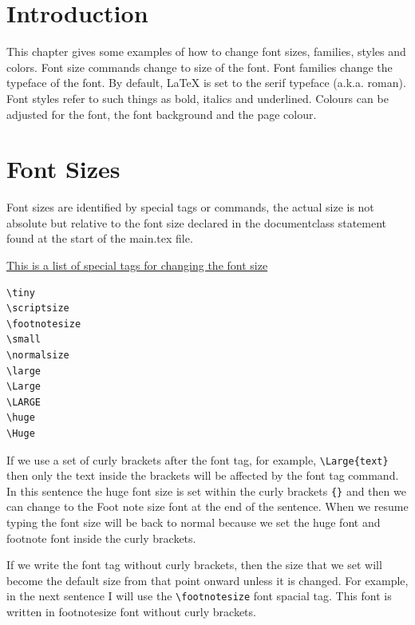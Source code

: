 


\section{Introduction}

This chapter gives some examples of how to change font sizes, families, styles and colors. Font size  commands change to size of the font. Font families change the typeface of the font. By default, LaTeX is set to the serif typeface (a.k.a. roman). Font styles refer to such things as bold, italics and underlined. Colours can be adjusted for the font, the font background and the page colour. 


\section{Font Sizes}

Font sizes are identified by special tags or commands, the actual size is not absolute but relative to the font size declared in the documentclass statement found at the start of the main.tex file.

\vspace{0.3cm}

\underline{This is a list of special tags for changing the font size}
\begin{verbatim}
\tiny 
\scriptsize
\footnotesize
\small
\normalsize
\large
\Large
\LARGE
\huge
\Huge
\end{verbatim}



If we use a set of curly brackets after the font tag, for example, \verb|\Large{text}| then only the text inside the brackets will be affected by the font tag command. In this sentence the {\huge huge font size} is set within the curly brackets \verb|{}| and then we can change to the {\footnotesize Foot note size font at the end of the sentence}. When we resume typing the font size will be back to normal because we set the huge font and footnote font inside the curly brackets. 

\vspace{0.3cm}

If we write the font tag without curly brackets, then the size that we set will become the default size from that point onward unless it is changed. For example, in the next sentence I will use the \verb|\footnotesize| font spacial tag. \footnotesize This font is written in footnotesize font without curly brackets. 

